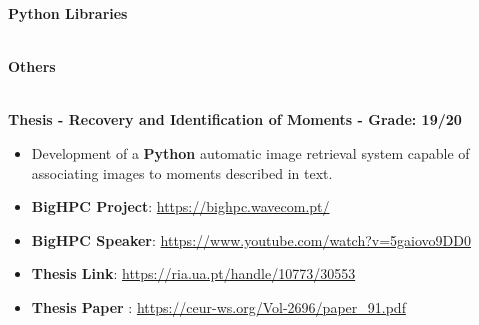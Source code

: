 \documentclass[10pt,a4paper,ragged2e,withhyper]{altacv}
\begin{document}
\begin{paracol}{2}
      \textbf{Python Libraries}
      \newline \medbreak
       \\ \smallbreak
       \\ \smallbreak
      \newline \medbreak

      \textbf{Others}
      \newline \medbreak
      \\ \smallbreak
      \\ \smallbreak
       \smallbreak
       \smallbreak

\end{paracol}



\textbf{Thesis - Recovery and Identification of Moments - Grade: 19/20}
\smallskip
\begin{itemize}
      \item Development of a \textbf{Python} automatic image retrieval system capable of
            associating images to moments described in text.

\end{itemize}

\begin{paracol}{2}

      \begin{itemize}
            \item \textbf{BigHPC Project}: \url{https://bighpc.wavecom.pt/}
            \item \textbf{BigHPC Speaker}: \url{https://www.youtube.com/watch?v=5gaiovo9DD0}
            \item \textbf{Thesis Link}: \url{https://ria.ua.pt/handle/10773/30553}
            \item \textbf{Thesis Paper }: \url{https://ceur-ws.org/Vol-2696/paper_91.pdf}
      \end{itemize}

      \switchcolumn

       \\ \smallbreak

\end{paracol}
\end{document}
